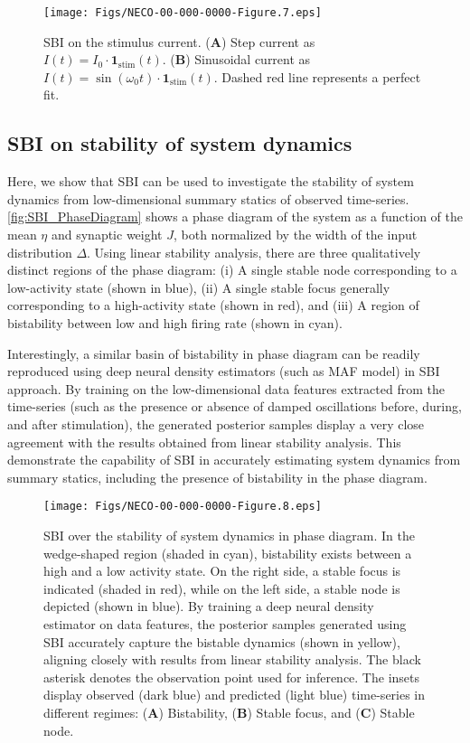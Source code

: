 \documentclass[12pt]{article}
\begin{document}
\begin{figure}
    \centering
    \texttt{[image: Figs/NECO-00-000-0000-Figure.7.eps]}
    \caption{SBI on the stimulus current. (\textbf{A}) Step current as $I(t)=I_0 \cdot \mathbf{1}_{\text{stim}}(t)$. (\textbf{B}) Sinusoidal current as $I(t)=\sin (\omega_0 t) \cdot \mathbf{1}_{\text{stim}}(t)$. Dashed red line represents a perfect fit.  }
    \label{fig:SBI_stimulus}
\end{figure}


\subsection{SBI on stability of system dynamics}

Here, we show that SBI can be used to investigate the stability of system dynamics from low-dimensional summary statics of observed time-series. \autoref{fig:SBI_PhaseDiagram} shows a phase diagram of the system as a function of the mean $\eta$ and synaptic weight $J$, both normalized by the width of the input distribution $\Delta$. Using linear stability analysis, there are three qualitatively distinct regions of the phase diagram: (i) A single stable node corresponding to a low-activity state (shown in blue), (ii) A single stable focus generally corresponding to a high-activity state (shown in red), and (iii) A region of bistability between low and high firing rate (shown in cyan).  

Interestingly, a similar basin of bistability in phase diagram can be readily reproduced using deep neural density estimators (such as MAF model) in SBI approach. By training on the low-dimensional data features extracted from the time-series (such as the presence or absence of damped oscillations before, during, and after stimulation), the generated posterior samples display a very close agreement with the results obtained from linear stability analysis. This demonstrate the capability of SBI in accurately estimating system dynamics from summary statics, including the presence of bistability in the phase diagram.

\begin{figure}
    \centering
    \texttt{[image: Figs/NECO-00-000-0000-Figure.8.eps]}
    \caption{SBI over the stability of system dynamics in phase diagram. In the wedge-shaped region (shaded in cyan), bistability exists between a high and a low activity state. On the right side, a stable focus is indicated (shaded in red), while on the left side, a stable node is depicted (shown in blue). By training a deep neural density estimator on data features, the posterior samples generated using SBI accurately capture the bistable dynamics (shown in yellow), aligning closely with results from linear stability analysis. The black asterisk denotes the observation point used for inference. The insets display observed (dark blue) and predicted (light blue) time-series in different regimes: (\textbf{A}) Bistability, (\textbf{B}) Stable focus, and (\textbf{C}) Stable node.}
    \label{fig:SBI_PhaseDiagram}
\end{figure}
\end{document}
